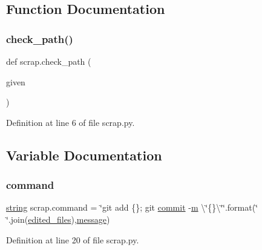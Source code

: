 \subsection{Function Documentation}
\mbox{\label{namespacescrap_a32ed8c257e2ca3d4484dca9a4ba5b624}} 
\subsubsection{\texorpdfstring{check\+\_\+path()}{check\_path()}}
{\footnotesize\ttfamily def scrap.\+check\+\_\+path (\begin{DoxyParamCaption}\item[{}]{given }\end{DoxyParamCaption})}



Definition at line 6 of file scrap.\+py.



\subsection{Variable Documentation}
\mbox{\label{namespacescrap_a9f58e341a42be029584e388bc72153a7}} 
\subsubsection{\texorpdfstring{command}{command}}
{\footnotesize\ttfamily \mbox{\hyperlink{glad_8h_ae84541b4f3d8e1ea24ec0f466a8c568b}{string}} scrap.\+command = \char`\"{}git add \{\}; git \mbox{\hyperlink{glad_8h_a5c56d586c7b2588c4f0413e1a92fd181}{commit}} -\/\mbox{\hyperlink{glad_8h_a11941354c1d09e70ec63bde35fc79d4f}{m}} \textbackslash{}\char`\"{}\{\}\textbackslash{}\char`\"{}\char`\"{}.format(\char`\"{} \char`\"{}.join(\mbox{\hyperlink{namespacescrap_a7a72c539742d79b4921ff0e4461bcbee}{edited\+\_\+files}}),\mbox{\hyperlink{glad_8h_a7b6161cffb9b8aee272b3b916183d28c}{message}})}



Definition at line 20 of file scrap.\+py.

\mbox{\label{namespacescrap_a7a72c539742d79b4921ff0e4461bcbee}} 
